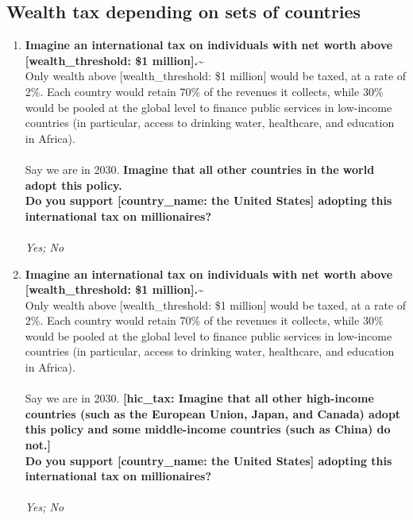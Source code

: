  \subsection*{Wealth tax depending on sets of countries} 
 \begin{enumerate}[resume] 
\item  \label{q:global_tax_support} \textbf{Imagine an international tax on individuals with net worth above [wealth\_threshold: \$1 million].\~}\\Only wealth above [wealth\_threshold: \$1 million] would be taxed, at a rate of 2\%. Each country would retain 70\% of the revenues it collects, while 30\% would be pooled at the global level to finance public services in low-income countries (in particular, access to drinking water, healthcare, and education in Africa). \\\\Say we are in 2030. \textbf{Imagine that all other countries in the world adopt this policy. \\Do you support [country\_name: the United States] adopting this international tax on millionaires?}\\ [\textit{Figure \ref{fig:global_tax_support}}; 
\verb|global_tax_support|]
  \\ \textit{Yes; No}

\item  \label{q:hic_tax_support} \textbf{Imagine an international tax on individuals with net worth above [wealth\_threshold: \$1 million].\~}\\Only wealth above [wealth\_threshold: \$1 million] would be taxed, at a rate of 2\%. Each country would retain 70\% of the revenues it collects, while 30\% would be pooled at the global level to finance public services in low-income countries (in particular, access to drinking water, healthcare, and education in Africa). \\\\Say we are in 2030. \textbf{[hic\_tax: Imagine that all other high-income countries (such as the European Union, Japan, and Canada) adopt this policy and some middle-income countries (such as China) do not.]}\textbf{\~\\Do you support [country\_name: the United States] adopting this international tax on millionaires?}\\ [\textit{Figure \ref{fig:hic_tax_support}}; 
\verb|hic_tax_support|]
  \\ \textit{Yes; No}


\end{enumerate}

